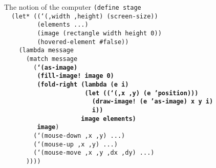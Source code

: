 \begin{frame}{The notion of the computer}
  \scriptsize
  \texttt{(define stage\\
    \ \ (let* ((`(,width ,height) (screen-size))\\
    \ \ \ \ \ \ \ \ \ (elements ...)\\
    \ \ \ \ \ \ \ \ \ (image (rectangle width height 0))\\
    \ \ \ \ \ \ \ \ \ (hovered-element \#false))\\
    \ \ \ \ (lambda message\\
    \ \ \ \ \ \ (match message\\
    \ \ \ \ \ \ \ \ (\textbf{`(as-image)\\
      \ \ \ \ \ \ \ \ \ (fill-image!\ image 0)\\
      \ \ \ \ \ \ \ \ \ (fold-right (lambda (e i)\\
      \ \ \ \ \ \ \ \ \ \ \ \ \ \ \ \ \ \ \ \ \ \ (let ((`(,x ,y) (e 'position)))\\
      \ \ \ \ \ \ \ \ \ \ \ \ \ \ \ \ \ \ \ \ \ \ \ \ (draw-image!\ (e 'as-image) x y i)\\
      \ \ \ \ \ \ \ \ \ \ \ \ \ \ \ \ \ \ \ \ \ \ \ \ i))\\
      \ \ \ \ \ \ \ \ \ \ \ \ \ \ \ \ \ \ \ \ \ image elements)\\
      \ \ \ \ \ \ \ \ \ image})\\
    \ \ \ \ \ \ \ \ (`(mouse-down ,x ,y) ...)\\
    \ \ \ \ \ \ \ \ (`(mouse-up ,x ,y) ...)\\
    \ \ \ \ \ \ \ \ (`(mouse-move ,x ,y ,dx ,dy) ...)\\
    \ \ \ \ \ \ ))))\\
    \ \\
    \ \\
    \ 
}
\end{frame}

